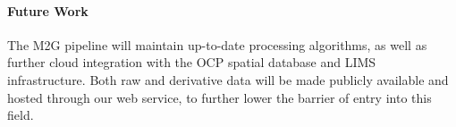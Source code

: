 \documentclass[12pt]{article}
\begin{document}
\paragraph{Future Work}
The M2G pipeline will maintain up-to-date processing algorithms, as well as further cloud integration with the OCP spatial database and LIMS infrastructure. Both raw and derivative data will be made publicly available and hosted through our web service, to further lower the barrier of entry into this field.

%
%
\end{document}

